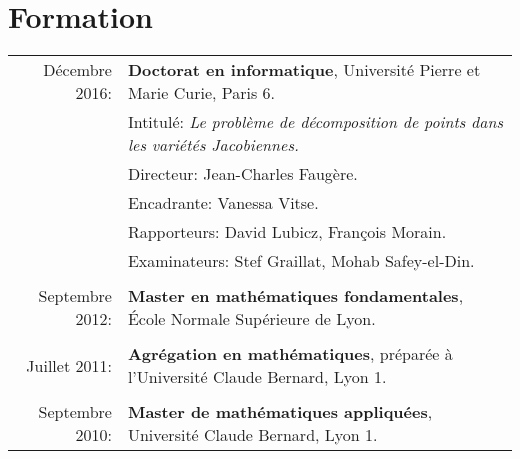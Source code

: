 \documentclass[11pt]{article}
\begin{document}
\section{Formation}

\hspace{-0.35cm} \begin{tabular}{rl}
 Décembre 2016: & \textbf{Doctorat en informatique}, Université Pierre et Marie Curie, Paris 6.\\
                & Intitulé: {\em Le problème de décomposition de points dans les variétés Jacobiennes.}\\
                & Directeur: Jean-Charles Faugère. \\
                & Encadrante: Vanessa Vitse.\\
                & Rapporteurs: David Lubicz, François Morain. \\
                &Examinateurs: Stef Graillat, Mohab Safey-el-Din.\\
                &  \\
Septembre 2012: & \textbf{Master en mathématiques fondamentales}, \'Ecole Normale Supérieure de Lyon.\\
                & \\
Juillet 2011:   & \textbf{Agrégation en mathématiques}, préparée à l'Université Claude Bernard, Lyon 1.\\
                & \\
Septembre 2010: & \textbf{Master de mathématiques appliquées}, Université Claude Bernard, Lyon 1.\\
\end{tabular}

\end{document}

